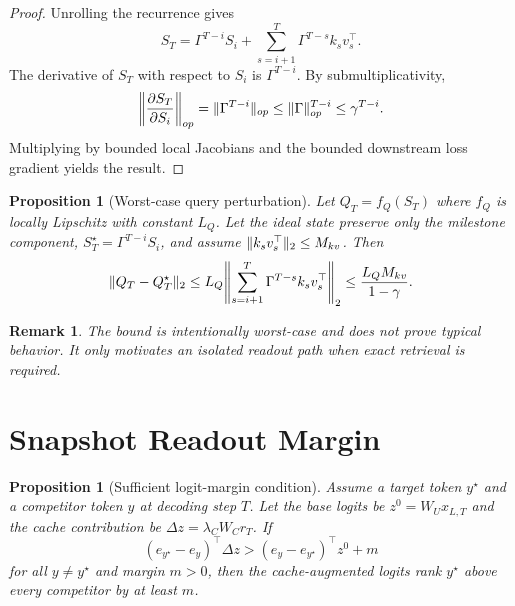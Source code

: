 \documentclass[11pt]{article}
\newtheorem{proposition}[theorem]{Proposition}
\newtheorem{remark}[theorem]{Remark}
\DeclarePairedDelimiter{\norm}{\lVert}{\rVert}
\begin{document}
\begin{proof}
Unrolling the recurrence gives
\begin{equation}
S_T=\Gamma^{T-i}S_i + \sum_{s=i+1}^{T}\Gamma^{T-s}k_s v_s^\top.
\end{equation}
The derivative of $S_T$ with respect to $S_i$ is $\Gamma^{T-i}$. By submultiplicativity,
\begin{equation}
\norm*{\frac{\partial S_T}{\partial S_i}}_{op}
=\norm{\Gamma^{T-i}}_{op}
\leq \norm{\Gamma}_{op}^{T-i}
\leq \gamma^{T-i}.
\end{equation}
Multiplying by bounded local Jacobians and the bounded downstream loss gradient yields the result.
\end{proof}

\begin{proposition}[Worst-case query perturbation]
Let $Q_T=f_Q(S_T)$ where $f_Q$ is locally Lipschitz with constant $L_Q$. Let the ideal state preserve only the milestone component, $S_T^{\star}=\Gamma^{T-i}S_i$, and assume $\norm{k_s v_s^\top}_2\leq M_{kv}$. Then
\begin{equation}
\norm{Q_T-Q_T^{\star}}_2
\leq L_Q\norm*{\sum_{s=i+1}^{T}\Gamma^{T-s}k_s v_s^\top}_2
\leq \frac{L_Q M_{kv}}{1-\gamma}.
\end{equation}
\end{proposition}

\begin{remark}
The bound is intentionally worst-case and does not prove typical behavior. It only motivates an isolated readout path when exact retrieval is required.
\end{remark}

\section{Snapshot Readout Margin}
\label{app:snapshot}

\begin{proposition}[Sufficient logit-margin condition]\label{prop:logit-margin}
Assume a target token $y^\star$ and a competitor token $y$ at decoding step $T$. Let the base logits be $z^0=W_Ux_{L,T}$ and the cache contribution be $\Delta z=\lambda_C W_C r_T$. If
\begin{equation}
\label{eq:logit-margin}
(e_{y^\star}-e_y)^\top \Delta z
>
(e_y-e_{y^\star})^\top z^0 + m
\end{equation}
for all $y\neq y^\star$ and margin $m>0$, then the cache-augmented logits rank $y^\star$ above every competitor by at least $m$.
\end{proposition}
\end{document}
